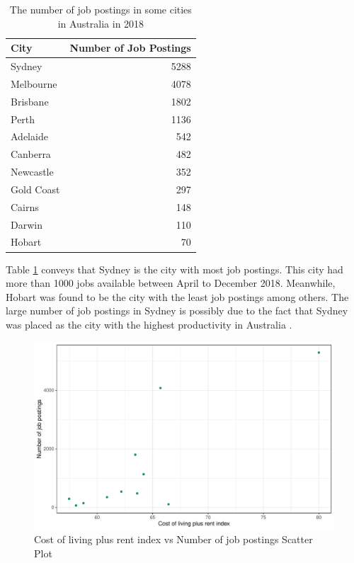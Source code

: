 \documentclass[11pt,a4paper,]{article}
\begin{document}
\begin{table}

\caption{\label{tab:jobcity}The number of job postings in some cities in Australia in 2018}
\centering
\begin{tabular}[t]{lr}
\toprule
City & Number of Job Postings\\
\midrule
Sydney & 5288\\
Melbourne & 4078\\
Brisbane & 1802\\
Perth & 1136\\
Adelaide & 542\\
\addlinespace
Canberra & 482\\
Newcastle & 352\\
Gold Coast & 297\\
Cairns & 148\\
Darwin & 110\\
\addlinespace
Hobart & 70\\
\bottomrule
\end{tabular}
\end{table}

Table \ref{tab:jobcity} conveys that Sydney is the city with most job postings. This city had more than 1000 jobs available between April to December 2018. Meanwhile, Hobart was found to be the city with the least job postings among others. The large number of job postings in Sydney is possibly due to the fact that Sydney was placed as the city with the highest productivity in Australia \autocite{pwcreport}.

\begin{figure}
\centering
\includegraphics{Team_JHDP_Assignment4_files/figure-latex/corrplot-1.pdf}
\caption{\label{fig:corrplot}Cost of living plus rent index vs Number of job postings Scatter Plot}
\end{figure}
\end{document}
